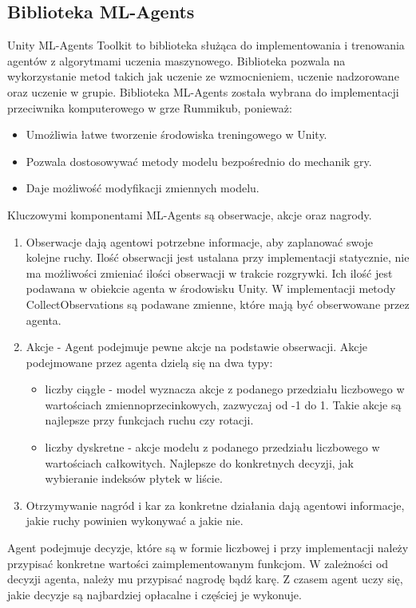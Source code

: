 \documentclass[a4paper,twoside,12pt]{book}
\begin{document}
	\subsection{Biblioteka ML-Agents} \label{ch:ml_a}
		Unity ML-Agents Toolkit to biblioteka służąca do implementowania i trenowania agentów z algorytmami uczenia maszynowego. Biblioteka pozwala na wykorzystanie metod takich jak uczenie ze wzmocnieniem, uczenie nadzorowane oraz uczenie w grupie. Biblioteka ML-Agents została wybrana do implementacji przeciwnika komputerowego w grze Rummikub, ponieważ:
		
		\begin{itemize}
			\item Umożliwia łatwe tworzenie środowiska treningowego w Unity.
			\item Pozwala dostosowywać metody modelu bezpośrednio do mechanik gry.
			\item Daje możliwość modyfikacji zmiennych modelu.
		\end{itemize}
		
		Kluczowymi komponentami ML-Agents są obserwacje, akcje oraz nagrody. 
		\begin{enumerate}
			\item Obserwacje dają agentowi potrzebne informacje, aby zaplanować swoje kolejne ruchy. Ilość obserwacji jest ustalana przy implementacji statycznie, nie ma możliwości zmieniać ilości obserwacji w trakcie rozgrywki. Ich ilość jest podawana w obiekcie agenta w środowisku Unity. W implementacji metody CollectObservations są podawane zmienne, które mają być obserwowane przez agenta. 
			\item Akcje - Agent podejmuje pewne akcje na podstawie obserwacji. Akcje podejmowane przez agenta dzielą się na dwa typy:
			\begin{itemize}
				\item liczby ciągłe - model wyznacza akcje z podanego przedziału liczbowego w wartościach zmiennoprzecinkowych, zazwyczaj od -1 do 1. Takie akcje są najlepsze przy funkcjach ruchu czy rotacji.
				\item liczby dyskretne - akcje modelu z podanego przedziału liczbowego w wartościach całkowitych. Najlepsze do konkretnych decyzji, jak wybieranie indeksów płytek w liście.
			\end{itemize}
			\item Otrzymywanie nagród i kar za konkretne działania dają agentowi informacje, jakie ruchy powinien wykonywać a jakie nie.
		\end{enumerate}
		Agent podejmuje decyzje, które są w formie liczbowej i przy implementacji należy przypisać konkretne wartości zaimplementowanym funkcjom. W zależności od decyzji agenta, należy mu przypisać nagrodę bądź karę. Z czasem agent uczy się, jakie decyzje są najbardziej opłacalne i częściej je wykonuje.
		
\end{document}
